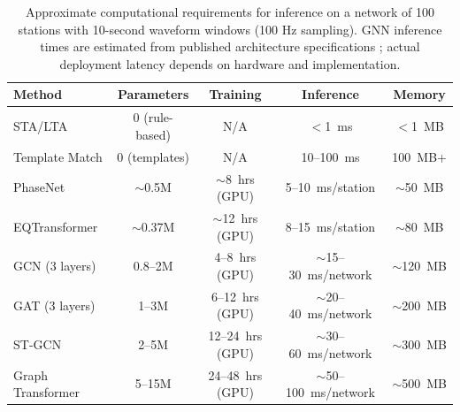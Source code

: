 \documentclass[review,authoryear]{elsarticle}
\begin{document}
\begin{table}[htbp]
\centering
\caption{Approximate computational requirements for inference on a network of 100 stations with 10-second waveform windows (100 Hz sampling). GNN inference times are estimated from published architecture specifications \citep{vandenende2020automated, mcbrearty2023earthquake, bloemheuvel2022graph}; actual deployment latency depends on hardware and implementation.}
\label{tab:computational}
\small
\begin{tabular}{lcccc}
\toprule
\textbf{Method} & \textbf{Parameters} & \textbf{Training} & \textbf{Inference} & \textbf{Memory} \\
\midrule
STA/LTA & 0 (rule-based) & N/A & $<$1~ms & $<$1~MB \\
Template Match & 0 (templates) & N/A & 10--100~ms & 100~MB+ \\
PhaseNet & $\sim$0.5M & $\sim$8~hrs (GPU) & 5--10~ms/station & $\sim$50~MB \\
EQTransformer & $\sim$0.37M & $\sim$12~hrs (GPU) & 8--15~ms/station & $\sim$80~MB \\
GCN (3 layers) & 0.8--2M & 4--8~hrs (GPU) & $\sim$15--30~ms/network & $\sim$120~MB \\
GAT (3 layers) & 1--3M & 6--12~hrs (GPU) & $\sim$20--40~ms/network & $\sim$200~MB \\
ST-GCN & 2--5M & 12--24~hrs (GPU) & $\sim$30--60~ms/network & $\sim$300~MB \\
Graph Transformer & 5--15M & 24--48~hrs (GPU) & $\sim$50--100~ms/network & $\sim$500~MB \\
\bottomrule
\end{tabular}
\end{table}
\end{document}

